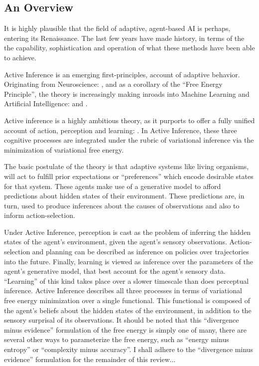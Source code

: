 \documentclass[onecolumn]{IEEEtran}
\begin{document}
\subsection{An Overview}

It is highly plausible that the field of adaptive, agent-based AI is perhaps, entering its Renaissance. The last few years have made history, in terms of the the capability, sophistication and operation of what these methods have been able to achieve.

Active Inference is an emerging first-principles, account of adaptive behavior. Originating from Neuroscience: \textcite{A_FEP_For_The_Brain}, \textcite{The-Bayesian-Brain} and \textcite{Action-Behaviour-FE} as a corollary of the ``Free Energy Principle'', the theory is increasingly making inroads into Machine Learning and Artificial Intelligence: \textcite{RL-or-AIF} and \textcite{Applications-of-FEP-Machine-Learning-Neuroscience}. 

Active inference is a highly ambitious theory, as it purports to offer a fully unified account of action, perception and learning: \textcite{FEP-Unified-Brain-Theory}. In Active Inference, these three cognitive processes are integrated under the rubric of variational inference via the minimization of variational free energy. 

The basic postulate of the theory is that adaptive systems like living organisms, will act to fulfill prior expectations or ``preferences'' which encode desirable states for that system. These agents make use of a generative model to afford predictions about hidden states of their environment. These predictions are, in turn, used to produce inferences about the causes of observations and also to inform action-selection. 

Under Active Inference, perception is cast as the problem of inferring the hidden states of the agent's environment, given the agent's sensory observations. Action-selection and planning can be described as inference on policies over trajectories into the future. Finally, learning is viewed as inference over the parameters of the agent's generative model, that best account for the agent's sensory data. ``Learning'' of this kind takes place over a slower timescale than does perceptual inference. Active Inference describes all three processes in terms of variational free energy minimization over a single functional. This functional is composed of the agent's beliefs about the hidden states of the environment, in addition to the sensory surprisal of its observations. It should be noted that this ``divergence minus evidence'' formulation of the free energy is simply one of many, there are several other ways to parameterize the free energy, such as ``energy minus entropy'' or ``complexity minus accuracy''. I shall adhere to the ``divergence minus evidence'' formulation for the remainder of this review...
\end{document}
